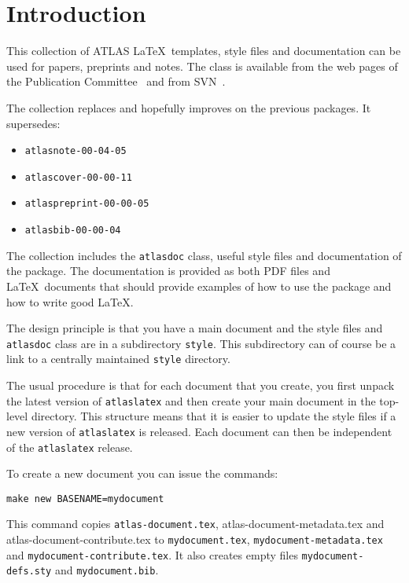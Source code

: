 \documentclass{style/atlasdoc}
\author{Ian Brock}
\begin{document}
\tableofcontents
\clearpage

\section{Introduction}
\label{sec:intro}

This collection of ATLAS \LaTeX\ templates, style files and documentation
can be used for papers, preprints and notes. 
The class is available from the web pages of the Publication Committee~\cite{pubcom} and from 
SVN~\cite{pubcom-svn}.

The collection replaces and hopefully improves on the previous packages. It supersedes:
\begin{itemize}
\item \texttt{atlasnote-00-04-05}
\item \texttt{atlascover-00-00-11}
\item \texttt{atlaspreprint-00-00-05}
\item \texttt{atlasbib-00-00-04}
\end{itemize}

The collection includes the \texttt{atlasdoc} class, useful style files
and documentation of the package.
The documentation is provided as both PDF files and \LaTeX\ documents
that should provide examples of how to use the package and how to write
good \LaTeX.

The design principle is that you have a main document and 
the style files and \texttt{atlasdoc} class are in a subdirectory \texttt{style}.
This subdirectory can of course be a link to a centrally maintained \texttt{style} directory.

The usual procedure is that for each document that you create,
you first unpack the latest version of \texttt{atlaslatex} and
then create your main document in the top-level directory.
This structure means that it is easier to update the style files if a new version of
\texttt{atlaslatex} is released. 
Each document can then be independent of the \texttt{atlaslatex} release.

To create a new document you can issue the commands:
%
\begin{verbatim}
make new BASENAME=mydocument
\end{verbatim}
%
This command copies \texttt{atlas-document.tex}, 
{atlas-document-metadata.tex} and {atlas-document-contribute.tex}
to \texttt{mydocument.tex},  \texttt{mydocument-metadata.tex} and
\texttt{mydocument-contribute.tex}.
It also creates empty files \texttt{mydocument-defs.sty} and \texttt{mydocument.bib}.
\end{document}
